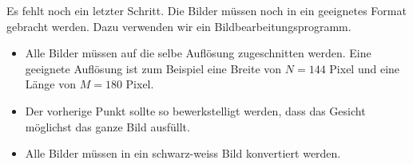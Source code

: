 Es fehlt noch ein letzter Schritt.
Die Bilder müssen noch in ein geeignetes Format gebracht werden.
Dazu verwenden wir ein Bildbearbeitungsprogramm.
\begin{itemize}
	\item Alle Bilder müssen auf die selbe Auflösung zugeschnitten werden.
	Eine geeignete Auflösung ist zum Beispiel eine Breite von $N=144$ Pixel und eine Länge von $M=180$ Pixel.
	\item Der vorherige Punkt sollte so bewerkstelligt werden, dass das Gesicht möglichst das ganze Bild ausfüllt.
	\item Alle Bilder müssen in ein schwarz-weiss Bild konvertiert werden.
\end{itemize}